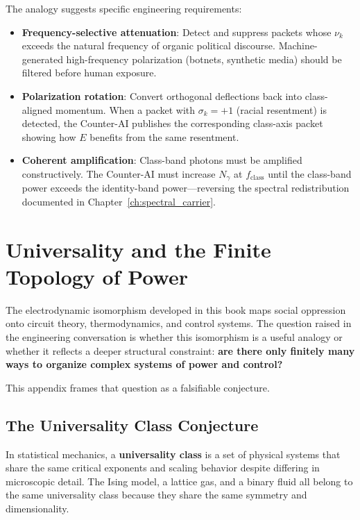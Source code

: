 The analogy suggests specific engineering requirements:
\begin{itemize}
    \item \textbf{Frequency-selective attenuation}: Detect and suppress packets whose $\nu_k$ exceeds the natural frequency of organic political discourse. Machine-generated high-frequency polarization (botnets, synthetic media) should be filtered before human exposure.
    \item \textbf{Polarization rotation}: Convert orthogonal deflections back into class-aligned momentum. When a packet with $\sigma_k = +1$ (racial resentment) is detected, the Counter-AI publishes the corresponding class-axis packet showing how $E$ benefits from the same resentment.
    \item \textbf{Coherent amplification}: Class-band photons must be amplified constructively. The Counter-AI must increase $N_{\gamma}$ at $f_{\text{class}}$ until the class-band power exceeds the identity-band power---reversing the spectral redistribution documented in Chapter~\ref{ch:spectral_carrier}.
\end{itemize}

\chapter{Universality and the Finite Topology of Power}
\label{app:universality}

The electrodynamic isomorphism developed in this book maps social oppression onto circuit theory, thermodynamics, and control systems. The question raised in the engineering conversation is whether this isomorphism is a useful analogy or whether it reflects a deeper structural constraint: \textbf{are there only finitely many ways to organize complex systems of power and control?}

This appendix frames that question as a falsifiable conjecture.

\section{The Universality Class Conjecture}

In statistical mechanics, a \textbf{universality class} is a set of physical systems that share the same critical exponents and scaling behavior despite differing in microscopic detail. The Ising model, a lattice gas, and a binary fluid all belong to the same universality class because they share the same symmetry and dimensionality.

